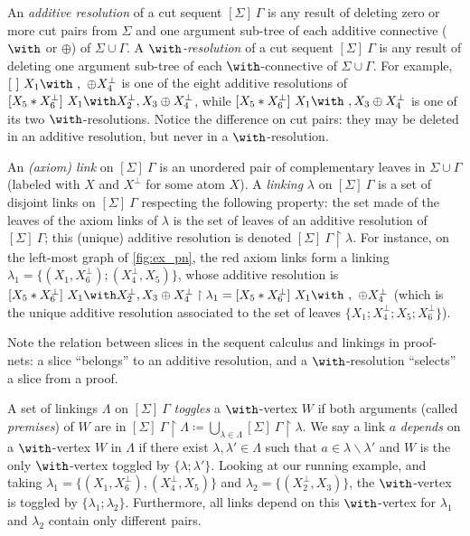 \documentclass{lmcs}
\newcommand*{\orth}{^\perp} %
\begin{document}
An \emph{additive resolution} of a cut sequent $[\Sigma]~\Gamma$ is any result of deleting zero or more cut pairs from $\Sigma$ and one argument sub-tree of each additive connective ($\with$ or $\oplus$) of $\Sigma\cup\Gamma$.
A \emph{$\with$-resolution} of a cut sequent $[\Sigma]~\Gamma$ is any result of deleting one argument sub-tree of each $\with$-connective of $\Sigma\cup\Gamma$.
For example, $[~]~X_1\with~, ~\oplus X_4\orth$ is one of the eight additive resolutions of $[X_5\ast X_6\orth]~X_1\with X_2\orth, X_3\oplus X_4\orth$, while $[X_5\ast X_6\orth]~X_1\with~, X_3\oplus X_4\orth$ is one of its two $\with$-resolutions.
Notice the difference on cut pairs: they may be deleted in an additive resolution, but never in a $\with$-resolution.

An \emph{(axiom) link} on $[\Sigma]~\Gamma$ is an unordered pair of complementary leaves in $\Sigma\cup\Gamma$ (labeled with $X$ and $X\orth$ for some atom $X$).
A \emph{linking} $\lambda$ on $[\Sigma]~\Gamma$ is a set of disjoint links on $[\Sigma]~\Gamma$ respecting the following property:
the set made of the leaves of the axiom links of $\lambda$ is the set of leaves of an additive resolution of $[\Sigma]~\Gamma$;
this (unique) additive resolution is denoted $[\Sigma]~\Gamma\upharpoonright\lambda$.
For instance, on the left-most graph of \autoref{fig:ex_pn}, the red axiom links form a linking $\lambda_1 = \{(X_1,X_6\orth);(X_4\orth,X_5)\}$, whose additive resolution is $[X_5\ast X_6\orth]~X_1\with X_2\orth, X_3\oplus X_4\orth\upharpoonright\lambda_1 = [X_5\ast X_6\orth]~X_1\with~, ~\oplus X_4\orth$ (which is the unique additive resolution associated to the set of leaves $\{X_1;X_4\orth;X_5;X_6\orth\}$).

Note the relation between slices in the sequent calculus and linkings in proof-nets: a slice ``belongs'' to an additive resolution, and a $\with$-resolution ``selects'' a slice from a proof.

A set of linkings $\Lambda$ on $[\Sigma]~\Gamma$ \emph{toggles} a $\with$-vertex $W$ if both arguments (called \emph{premises}) of $W$ are in ${[\Sigma]~\Gamma\upharpoonright\Lambda\coloneqq\bigcup_{\lambda\in\Lambda}[\Sigma]~\Gamma\upharpoonright\lambda}$.
We say a link $a$ \emph{depends} on a $\with$-vertex $W$ in $\Lambda$ if there exist $\lambda,\lambda'\in\Lambda$ such that $a\in\lambda\backslash\lambda'$ and $W$ is the only $\with$-vertex toggled by $\{\lambda;\lambda'\}$.
Looking at our running example, and taking $\lambda_1=\{(X_1, X_6\orth), (X_4\orth, X_5)\}$ and $\lambda_2=\{(X_2\orth, X_3)\}$, the $\with$-vertex is toggled by $\{\lambda_1;\lambda_2\}$.
Furthermore, all links depend on this $\with$-vertex for $\lambda_1$ and $\lambda_2$ contain only different pairs.
\end{document}

